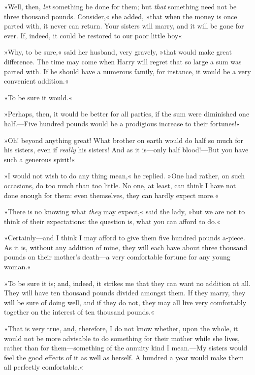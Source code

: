 »Well, then, \textit{let} something be done for them; but \textit{that} something need not be three thousand pounds. Consider,« she added, »that when the money is once parted with, it never can return. Your sisters will marry, and it will be gone for ever. If, indeed, it could be restored to our poor little boy\longdash«

»Why, to be sure,« said her husband, very gravely, »that would make great difference. The time may come when Harry will regret that so large a sum was parted with. If he should have a numerous family, for instance, it would be a very convenient addition.«

»To be sure it would.«

»Perhaps, then, it would be better for all parties, if the sum were diminished one half.—Five hundred pounds would be a prodigious increase to their fortunes!«

»Oh! beyond anything great! What brother on earth would do half so much for his sisters, even if \textit{really} his sisters! And as it is—only half blood!—But you have such a generous spirit!«

»I would not wish to do any thing mean,« he replied. »One had rather, on such occasions, do too much than too little. No one, at least, can think I have not done enough for them: even themselves, they can hardly expect more.«

»There is no knowing what \textit{they} may expect,« said the lady, »but we are not to think of their expectations: the question is, what you can afford to do.«

»Certainly—and I think I may afford to give them five hundred pounds a-piece. As it is, without any addition of mine, they will each have about three thousand pounds on their mother’s death—a very comfortable fortune for any young woman.«

»To be sure it is; and, indeed, it strikes me that they can want no addition at all. They will have ten thousand pounds divided amongst them. If they marry, they will be sure of doing well, and if they do not, they may all live very comfortably together on the interest of ten thousand pounds.«

»That is very true, and, therefore, I do not know whether, upon the whole, it would not be more advisable to do something for their mother while she lives, rather than for them—something of the annuity kind I mean.—My sisters would feel the good effects of it as well as herself. A hundred a year would make them all perfectly comfortable.«

